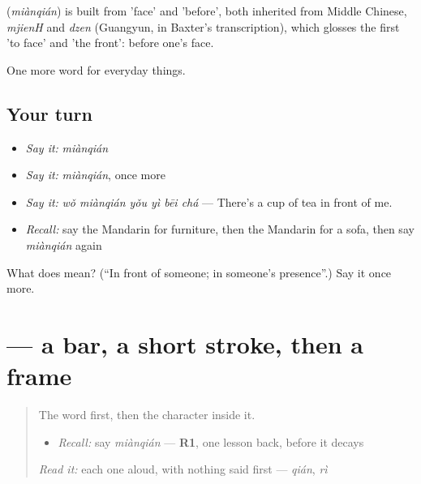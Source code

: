 \begin{cousinweb}
\textbf{} (\emph{miànqián}) is built from  'face' and  'before', both inherited from Middle Chinese, \emph{mjienH} and \emph{dzen} (Guangyun, in Baxter's transcription), which glosses the first 'to face' and 'the front': before one's face.
\end{cousinweb}

\begin{grammarlens}[title={What you've built}]
One more word for everyday things.
\end{grammarlens}

\subsection*{Your turn}
\begin{itemize}
\raggedright
  \item \emph{Say it:} \emph{miànqián}
  \item \emph{Say it:} \emph{miànqián}, once more
  \item \emph{Say it:} \emph{wǒ miànqián yǒu yì bēi chá} — There's a cup of tea in front of me.
  \item \emph{Recall:} say the Mandarin for furniture, then the Mandarin for a sofa, then say \emph{miànqián} again
\end{itemize}

\begin{tcolorbox}[breakable,colback=teal!4,colframe=teal!35!black,title={Before you move on}]
What does  mean? (\textquotedblleft{}In front of someone; in someone's presence\textquotedblright{}.) Say it once more.
\end{tcolorbox}
\section[\texorpdfstring{\zh{面} (miàn)}{面 (miàn)}]{ — a bar, a short stroke, then a frame}

\label{lesson:ZH-W175-mian-face}



\begin{quote}
The word first, then the character inside it.

\begin{itemize}
\raggedright
  \item \emph{Recall:} say \emph{miànqián} — \textbf{R1}, one lesson back, before it decays
\end{itemize}

\begin{quote}
 
\end{quote}

\emph{Read it:} each one aloud, with nothing said first — \emph{qián}, \emph{rì}
\end{quote}


